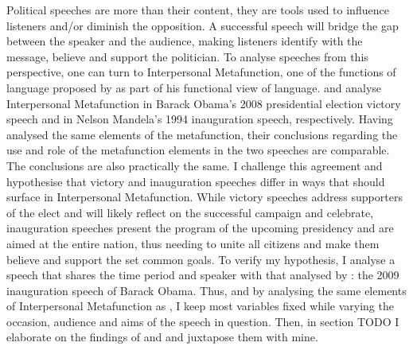 \documentclass[11pt]{article}
\begin{document}
{	%
	Political speeches are more than their content, they are tools used to influence listeners and/or diminish the opposition.
	A successful speech will bridge the gap between the speaker and the audience, making listeners identify with the message, believe and support the politician.
	To analyse speeches from this perspective, one can turn to Interpersonal Metafunction, one of the functions of language proposed by \citet{Halliday1970IM} as part of his functional view of language.
	\citet{Ye} and \citet{Nur} analyse Interpersonal Metafunction in Barack Obama's 2008 presidential election victory speech and in Nelson Mandela's 1994 inauguration speech, respectively. 
	Having analysed the same elements of the metafunction, their conclusions regarding the use and role of the metafunction elements in the two speeches are comparable. The conclusions are also practically the same.
	I challenge this agreement and hypothesise that victory and inauguration speeches differ in ways that should surface in Interpersonal Metafunction.
	While victory speeches address supporters of the elect and will likely reflect on the successful campaign and celebrate, inauguration speeches present the program of the upcoming presidency and are aimed at the entire nation, thus needing to unite all citizens and make them believe and support the set common goals.
	To verify my hypothesis, I analyse a speech that shares the time period and speaker with that analysed by \citeauthor{Ye}: the 2009 inauguration speech of Barack Obama. 
	Thus, and by analysing the same elements of Interpersonal Metafunction as \citeauthor{Ye}, I keep most variables fixed while varying the occasion, audience and aims of the speech in question. Then, in section TODO I elaborate on the findings of \citeauthor{Ye} and \citeauthor{Nur} and juxtapose them with mine.
}
\end{document}
